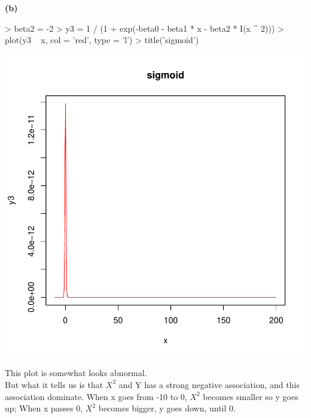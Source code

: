 \documentclass[a4paper]{article}
\renewcommand{\part}[1] {\vspace{.10in} {\bf (#1)}}
\begin{document}
\part{b}
\begin{Schunk}
\begin{Sinput}
> beta2 = -2
> y3 = 1 / (1 + exp(-beta0 - beta1 * x - beta2 * I(x ^ 2)))
> plot(y3 ~ x, col = 'red', type = 'l')
> title('sigmoid')
\end{Sinput}
\end{Schunk}
\includegraphics{category_response-2b}

{\color{red}
This plot is somewhat looks abnormal.\\ But what it tells us is that $X^2$ and Y has a strong negative association, and this association dominate. When x goes from -10 to 0, $X^2$ becomes smaller so y goes up; When x passes 0, $X^2$ becomes bigger, y goes down, until 0.
}
\end{document}

